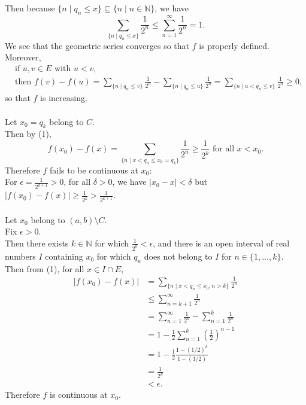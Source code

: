 \begin{enumerate}
\[    \]
    Then because $\{n\mid q_n\le x\}\subseteq\{n\mid n\in\mathbb{N}\}$, we have
    \[
        \sum_{\{n\mid q_n\le x\}}\frac{1}{2^n}\le \sum_{n=1}^\infty\frac{1}{2^n}=1.
    \]
    We see that the geometric series converges so that $f$ is properly defined.
    Moreover,
    \begin{align*}
        &\text{if }u,v\in E\text{ with }u<v,\\
        &\text{then }f(v)-f(u)=\sum_{\{n\mid q_n\le v\}}\frac{1}{2^n}-\sum_{\{n\mid q_n\le u\}}\frac{1}{2^n}=\sum_{\{n\mid u< q_n\le v\}}\frac{1}{2^n}\ge0,\tag{1}
    \end{align*}
    so that $f$ is increasing.\\
    \\Let $x_0=q_k$ belong to $C$.
    \\Then by (1),
    \[
        f(x_0)-f(x)=\sum_{\{n\mid x< q_n\le x_0=q_k\}}\frac{1}{2^n}\ge\frac{1}{2^k}\text{ for all }x<x_0.
    \]
    Therefore $f$ fails to be continuous at $x_0$:
    \\For $\epsilon=\frac{1}{2^{k+1}}>0$, for all $\delta>0$, we have $|x_0-x|<\delta$ but $|f(x_0)-f(x)|\ge\frac{1}{2^k}>\frac{1}{2^{k+1}}$.\\
    \\Let $x_0$ belong to $(a,b)\setminus C$.
    \\Fix $\epsilon>0$.
    \\Then there exists $k\in\mathbb{N}$ for which $\frac{1}{2^k}<\epsilon$, and there is an open interval of real numbers $I$ containing $x_0$ for which $q_n$ does not belong to $I$ for $n\in\{1,\dots,k\}$.
    \\Then from (1), for all $x\in I\cap E$,
    \begin{align*}
        |f(x_0)-f(x)|&=\sum_{\{n\mid x< q_n\le x_0,n>k\}}\frac{1}{2^n}\\
        &\le\sum_{n={k+1}}^\infty\frac{1}{2^n}\\
        &=\sum_{n=1}^\infty\frac{1}{2^n}-\sum_{n=1}^k\frac{1}{2^n}\\
        &=1-\frac{1}{2}\sum_{n=1}^k\left(\frac{1}{2}\right)^{n-1}\\
        &=1-\frac{1}{2}\frac{1-(1/2)^k}{1-(1/2)}\\
        &=\frac{1}{2^k}\\
        &<\epsilon.
    \end{align*}
    Therefore $f$ is continuous at $x_0$.
\end{enumerate}

